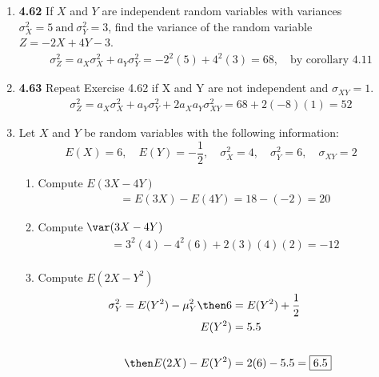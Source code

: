 \documentclass[basic, header]{nosvagor-notes}
\begin{document}
\begin{enumerate}[leftmargin=1.5em, itemsep=2em]
  \newpage %

  \item \textbf{4.62} If \(X\) and \(Y\) are independent random variables with
    variances \(\sigma^2_X = 5 ~\text{and}~ \sigma^2_Y = 3\), find the variance
    of the random variable \(Z = -2X + 4Y - 3\).
    \begin{align*}
      \sigma^2_Z = a_X\sigma^2_X + a_Y\sigma^2_Y = -2^2(5) + 4^2(3) = \boxed{68}, \quad \text{by corollary 4.11}
    \end{align*}

  \item \textbf{4.63} Repeat Exercise 4.62 if X and Y are not independent and
    \(\sigma_{XY} = 1\).
    \begin{align*}
      \sigma^2_Z = a_X\sigma^2_X + a_Y\sigma^2_Y + 2a_Xa_Y\sigma^2_{XY} = 68 + 2(-8)(1) = \boxed{52}
    \end{align*}

  \item Let \(X\) and \(Y\) be random variables with the following information:
    \[%
     E(X) = 6, \quad E(Y) = -\frac{1}{2}, \quad \sigma^2_X = 4, \quad \sigma^2_Y = 6, \quad \sigma_{XY} = 2
    \]%
    \begin{enumerate}[leftmargin=1.6em]

      \item Compute \(E(3X - 4Y)\)
        \begin{align*}
          &= E(3X) - E(4Y) = 18 - (-2) = \boxed{20}
        \end{align*}
      \item Compute \(\var(3X - 4Y)\)
        \begin{align*}
          &= 3^2(4) - 4^2(6) + 2(3)(4)(2)= \boxed{-12}\\
        \end{align*}
      \item Compute \(E(2X - Y^2)\)
        \begin{align*}
          \sigma^2_Y = E(Y^2) - \mu^2_Y
          \then 6 &= E(Y^2) + \frac{1}{2} \\
                E(Y^2)  &= 5.5 \\\\
         \then E(2X) - E(Y^2) &= 2(6) - 5.5 = \boxed{6.5}
        \end{align*}


\end{enumerate}
\end{enumerate}
\end{document}

